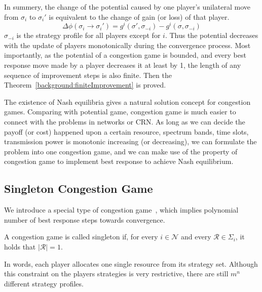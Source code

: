 In summery, the change of the potential caused by one player's unilateral move from $\sigma_i$ to $\sigma_i'$ is equivalent to the change of gain (or loss) of that player.
\begin{equation}
\label{5}
\varDelta \phi(\sigma_i \rightarrow \sigma_i') = g^i(\sigma',\sigma_{-i}) - g^i(\sigma,\sigma_{-i})
\end{equation}
$\sigma_{-i}$ is the strategy profile for all players except for $i$.
Thus the potential decreases with the update of players monotonically during the convergence process.
Most importantly, as the potential of a congestion game is bounded, and every best response move made by a player decreases it at least by 1, the length of any sequence of improvement steps is also finite.
Then the Theorem~\ref{background:finiteImprovement} is proved.



The existence of Nash equilibria gives a natural solution concept for congestion games.
Comparing with potential game, congestion game is much easier to connect with the problems in networks or CRN.
As long as we can decide the payoff (or cost) happened upon a certain resource, \ie spectrum bands, time slots, transmission power is monotonic increasing (or decreasing), we can formulate the problem into one congestion game, and we can make use of the property of congestion game to implement best response to achieve Nash equilibrium.



\subsection{Singleton Congestion Game}
We introduce a special type of congestion game~\cite{aaai_IeongMNSS05}, which implies polynomial number of best response steps towards convergence.


\begin{mydef}
\label{background:singleton}
A congestion game is called singleton if, for every $i\in \mathcal{N}$ and every $\mathcal{R}\in \Sigma_i$, it holds that $|\mathcal{R}|=1$.
\end{mydef}
In words, each player allocates one single resource from its strategy set.
Although this constraint on the players strategies is very restrictive, there are still $m^n$ different strategy profiles.

